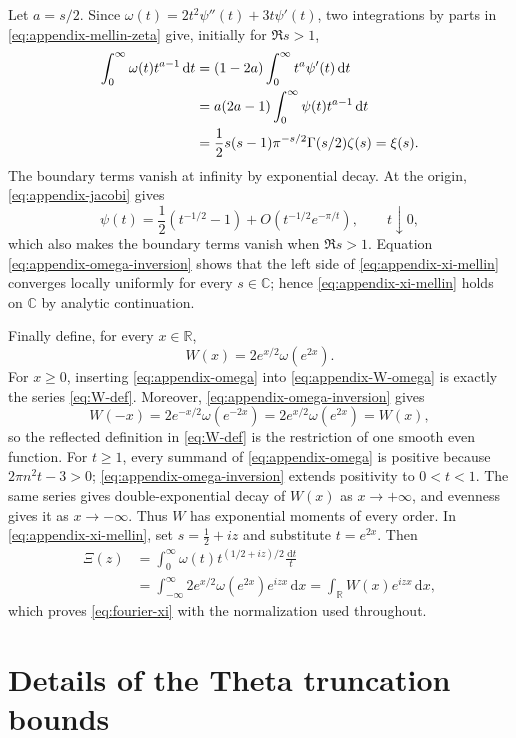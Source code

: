 \documentclass[11pt,reqno]{amsart}
\numberwithin{equation}{section}
\newcommand{\C}{\mathbb C}
\newcommand{\R}{\mathbb R}
\newcommand{\1}{\mathbf 1}
\newcommand{\dd}{\,\mathrm d}
\begin{document}
Let $a=s/2$.  Since
$\omega(t)=2t^2\psi''(t)+3t\psi'(t)$, two integrations by parts in
\eqref{eq:appendix-mellin-zeta} give, initially for $\Re s>1$,
\begin{align}
 \int_0^\infty\omega(t)t^{a-1}\dd t
 &=(1-2a)\int_0^\infty t^a\psi'(t)\dd t\notag\\
 &=a(2a-1)\int_0^\infty\psi(t)t^{a-1}\dd t\notag\\
 &=\frac12s(s-1)\pi^{-s/2}\Gamma(s/2)\zeta(s)
 =\xi(s).
 \label{eq:appendix-xi-mellin}
\end{align}
The boundary terms vanish at infinity by exponential decay.  At the origin,
\eqref{eq:appendix-jacobi} gives
\[
 \psi(t)=\frac12(t^{-1/2}-1)
 +O\!\left(t^{-1/2}e^{-\pi/t}\right),
 \qquad t\downarrow0,
\]
which also makes the boundary terms vanish when $\Re s>1$.
Equation \eqref{eq:appendix-omega-inversion} shows that the left side of
\eqref{eq:appendix-xi-mellin} converges locally uniformly for every
$s\in\C$; hence \eqref{eq:appendix-xi-mellin} holds on $\C$ by analytic
continuation.

Finally define, for every $x\in\R$,
\begin{equation}\label{eq:appendix-W-omega}
 W(x)=2e^{x/2}\omega(e^{2x}).
\end{equation}
For $x\geq0$, inserting \eqref{eq:appendix-omega} into
\eqref{eq:appendix-W-omega} is exactly the series \eqref{eq:W-def}.
Moreover, \eqref{eq:appendix-omega-inversion} gives
\[
 W(-x)=2e^{-x/2}\omega(e^{-2x})
 =2e^{x/2}\omega(e^{2x})=W(x),
\]
so the reflected definition in \eqref{eq:W-def} is the restriction of one
smooth even function.  For $t\geq1$, every summand of
\eqref{eq:appendix-omega} is positive because $2\pi n^2t-3>0$;
\eqref{eq:appendix-omega-inversion} extends positivity to $0<t<1$.
The same series gives double-exponential decay of $W(x)$ as $x\to+\infty$,
and evenness gives it as $x\to-\infty$.  Thus $W$ has exponential moments of
every order.  In \eqref{eq:appendix-xi-mellin}, set
$s=\tfrac12+iz$ and substitute $t=e^{2x}$.  Then
\begin{align*}
 \Xi(z)
 &=\int_0^\infty\omega(t)t^{(1/2+iz)/2}\frac{\dd t}{t}\\
 &=\int_{-\infty}^{\infty}
 2e^{x/2}\omega(e^{2x})e^{izx}\dd x
 =\int_{\R}W(x)e^{izx}\dd x,
\end{align*}
which proves \eqref{eq:fourier-xi} with the normalization used throughout.

\section{Details of the Theta truncation bounds}\label{sec:appendix-tail}
\end{document}
